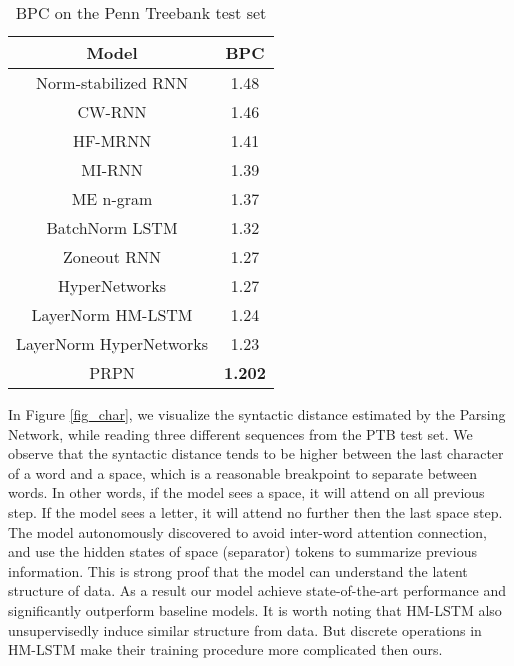 \documentclass{article} \usepackage{iclr2018_conference,times}
\begin{document}
\begin{table}[ht]  
\centering  
  \begin{tabular}{ c c }
    \toprule[2pt]
    Model & BPC \\
    \hline
    Norm-stabilized RNN \citep{krueger2015regularizing} &  1.48 \\
    CW-RNN \citep{koutnik2014clockwork} & 1.46 \\
    HF-MRNN \citep{mikolov2012subword} & 1.41 \\
    MI-RNN \citep{wu2016multiplicative} & 1.39 \\
    ME n-gram \citep{mikolov2012subword} & 1.37 \\
    BatchNorm LSTM \citep{cooijmans2016recurrent} & 1.32 \\
    Zoneout RNN \citep{krueger2016zoneout} & 1.27 \\
    HyperNetworks \citep{ha2016hypernetworks} & 1.27 \\
    LayerNorm HM-LSTM \citep{chung2016hierarchical} & 1.24 \\
    LayerNorm HyperNetworks \citep{ha2016hypernetworks} & 1.23 \\
    \hline
    PRPN & \textbf{1.202} \\
    \toprule[2pt]
  \end{tabular}
  \caption{BPC on the Penn Treebank test set}
  \label{tb_char_ptb}
\end{table}

In Figure \ref{fig_char}, we visualize the syntactic distance estimated by the Parsing Network, while reading three different sequences from the PTB test set. We observe that the syntactic distance tends to be higher between the last character of a word and a space, which is a reasonable breakpoint to separate between words. In other words, if the model sees a space, it will attend on all previous step. If the model sees a letter, it will attend no further then the last space step. The model autonomously discovered to avoid inter-word attention connection, and use the hidden states of space (separator) tokens to summarize previous information. This is strong proof that the model can understand the latent structure of data. As a result our model achieve state-of-the-art performance and significantly outperform baseline models. It is worth noting that HM-LSTM \citep{chung2016hierarchical} also unsupervisedly induce similar structure from data. But discrete operations in HM-LSTM make their training procedure more complicated then ours.
\end{document}
